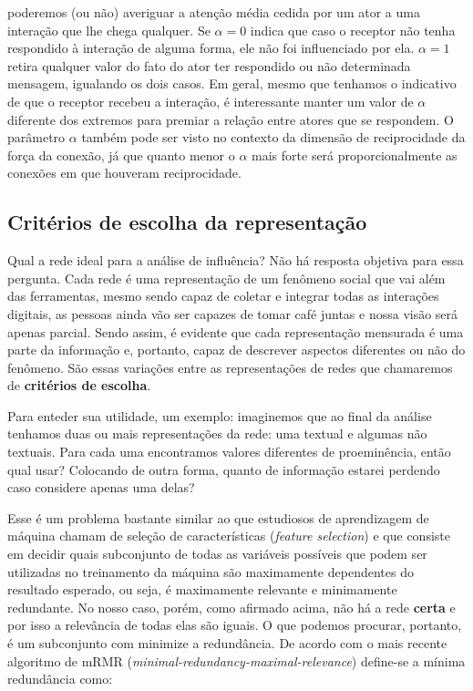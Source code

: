 \documentclass{article}
\begin{document}
\begin{itemize}
  poderemos (ou não) averiguar a atenção média cedida por um ator a uma
  interação que lhe chega qualquer. Se $\alpha=0$ indica que caso o receptor não
  tenha respondido à interação de alguma forma, ele não foi influenciado por
  ela. $\alpha=1$ retira qualquer valor do fato do ator ter respondido ou não
  determinada mensagem, igualando os dois casos. Em geral, mesmo que tenhamos o
  indicativo de que o receptor recebeu a interação, é interessante manter um
  valor de $\alpha$ diferente dos extremos para premiar a relação entre atores
  que se respondem. O parâmetro $\alpha$ também pode ser visto no contexto da
  dimensão de reciprocidade da força da conexão, já que quanto menor o $\alpha$
  mais forte será proporcionalmente as conexões em que houveram reciprocidade.
\end{itemize}

\subsection{Critérios de escolha da representação}

Qual a rede ideal para a análise de influência? Não há resposta objetiva para
essa pergunta. Cada rede é uma representação de um fenômeno social que vai além
das ferramentas, mesmo sendo capaz de coletar e integrar todas as interações
digitais, as pessoas ainda vão ser capazes de tomar café juntas e nossa visão
será apenas parcial. Sendo assim, é evidente que cada representação mensurada é
uma parte da informação e, portanto, capaz de descrever aspectos diferentes ou
não do fenômeno. São essas variações entre as representações de redes que
chamaremos de \textbf{critérios de escolha}.

Para enteder sua utilidade, um exemplo: imaginemos que ao final da análise
tenhamos duas ou mais representações da rede: uma textual e algumas não textuais.
Para cada uma encontramos valores diferentes de proeminência, então qual usar?
Colocando de outra forma, quanto de informação estarei perdendo caso considere
apenas uma delas?

\cite{Jain1997}\cite{Blum1997}\cite{Jain2000}
Esse é um problema bastante similar ao que estudiosos de aprendizagem de máquina
chamam de seleção de características (\textit{feature selection}) e que consiste
em decidir quais subconjunto de todas as variáveis possíveis que podem ser
utilizadas no treinamento da máquina são maximamente dependentes do resultado
esperado, ou seja, é maximamente relevante e minimamente redundante. No nosso
caso, porém, como afirmado acima, não há a rede \textbf{certa} e por isso a
relevância de todas elas são iguais. O que podemos procurar, portanto, é um
subconjunto com minimize a redundância. De acordo com o mais recente algoritmo
de mRMR (\textit{minimal-redundancy-maximal-relevance}) define-se a mínima
redundância como:
\end{document}

